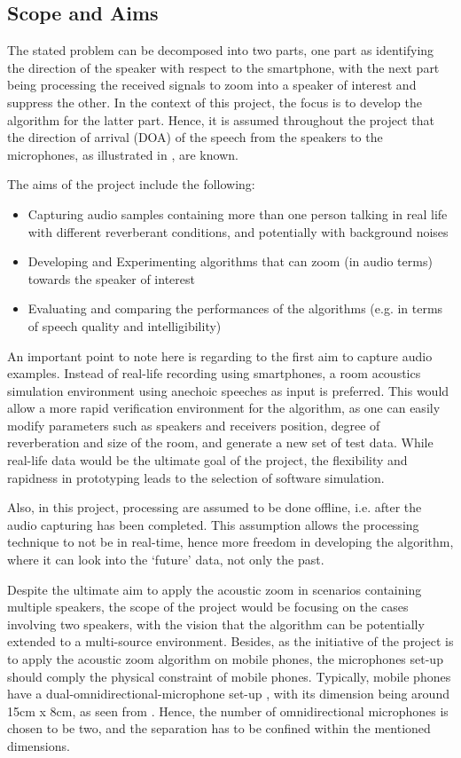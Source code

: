 \documentclass[a4paper,twoside,12pt,hidelinks]{article}
\begin{document}
\subsection{Scope and Aims}
The stated problem can be decomposed into two parts, one part as identifying the direction of the speaker with respect to the smartphone, with the next part being processing the received signals to zoom into a speaker of interest and suppress the other. In the context of this project, the focus is to develop the algorithm for the latter part. Hence, it is assumed throughout the project that the direction of arrival (DOA) of the speech from the speakers to the microphones, as illustrated in , are known.

The aims of the project include the following: 
\begin{itemize}
\item Capturing audio samples containing more than one person talking in real life with different reverberant conditions, and potentially with background noises
\item Developing and Experimenting algorithms that can zoom (in audio terms) towards the speaker of interest
\item Evaluating and comparing the performances of the algorithms (e.g. in terms of speech quality and intelligibility)
\end{itemize}

An important point to note here is regarding to the first aim to capture audio examples. Instead of real-life recording using smartphones, a room acoustics simulation environment using anechoic speeches as input is preferred. This would allow a more rapid verification environment for the algorithm, as one can easily modify parameters such as speakers and receivers position, degree of reverberation and size of the room, and generate a new set of test data. While real-life data would be the ultimate goal of the project, the flexibility and rapidness in prototyping leads to the selection of software simulation.

Also, in this project, processing are assumed to be done offline, i.e. after the audio capturing has been completed. This assumption allows the processing technique to not be in real-time, hence more freedom in developing the algorithm, where it can look into the `future' data, not only the past.

Despite the ultimate aim to apply the acoustic zoom in scenarios containing multiple speakers, the scope of the project would be focusing on the cases involving two speakers, with the vision that the algorithm can be potentially extended to a multi-source environment. Besides, as the initiative of the project is to apply the acoustic zoom algorithm on mobile phones, the microphones set-up should comply the physical constraint of mobile phones. Typically, mobile phones have a dual-omnidirectional-microphone set-up \cite{Jeub2012NoiseDifferences}, with its dimension being around 15cm x 8cm, as seen from . Hence, the number of omnidirectional microphones is chosen to be two, and the separation has to be confined within the mentioned dimensions. 
\end{document}
